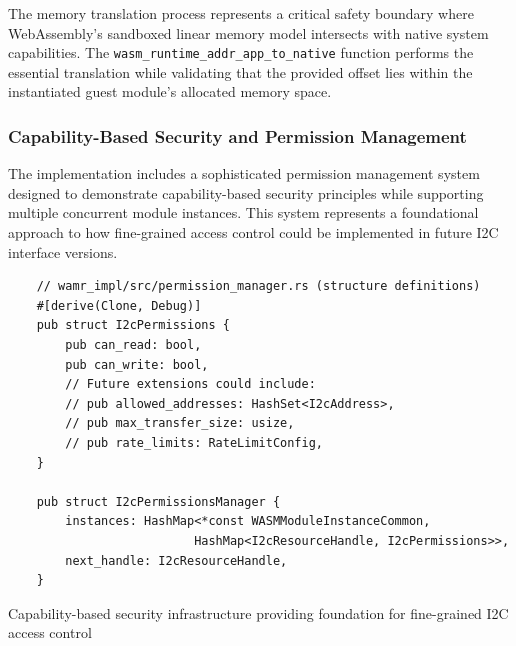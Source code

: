 The memory translation process represents a critical safety boundary where WebAssembly's sandboxed linear memory model intersects with native system capabilities. The \texttt{wasm\_runtime\_addr\_app\_to\_native} function performs the essential translation while validating that the provided offset lies within the instantiated guest module's allocated memory space.

\subsubsection{Capability-Based Security and Permission Management}

The implementation includes a sophisticated permission management system designed to demonstrate capability-based security principles while supporting multiple concurrent module instances. This system represents a foundational approach to how fine-grained access control could be implemented in future I2C interface versions.

\begin{listing}[H]
    \begin{verbatim}
    // wamr_impl/src/permission_manager.rs (structure definitions)
    #[derive(Clone, Debug)]
    pub struct I2cPermissions {
        pub can_read: bool,
        pub can_write: bool,
        // Future extensions could include:
        // pub allowed_addresses: HashSet<I2cAddress>,
        // pub max_transfer_size: usize,
        // pub rate_limits: RateLimitConfig,
    }
    
    pub struct I2cPermissionsManager {
        instances: HashMap<*const WASMModuleInstanceCommon, 
                          HashMap<I2cResourceHandle, I2cPermissions>>,
        next_handle: I2cResourceHandle,
    }
    \end{verbatim}
    \caption{Capability-based security infrastructure providing foundation for fine-grained I2C access control}
    \label{lst:permission-structures}
\end{listing}

